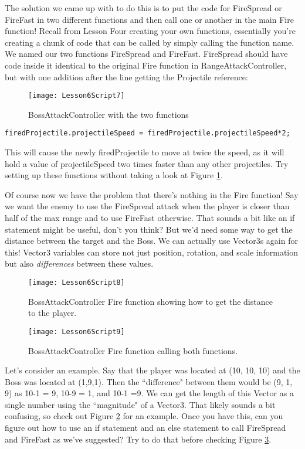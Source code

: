 \documentclass{article}
\begin{document}
The solution we came up with to do this is to put the code for FireSpread or FireFast in two different functions and then call one or another in the main Fire function! Recall from Lesson Four creating your own functions, essentially you're creating a chunk of code that can be called by simply calling the function name. We named our two functions FireSpread and FireFast. FireSpread should have code inside it identical to the original Fire function in RangeAttackController, but with one addition after the line getting the Projectile reference: 

 \begin{figure}
  \texttt{[image: Lesson6Script7]}
  \caption{BossAttackController with the two functions}
  \label{fig:Lesson6Script7}
\end{figure}

\lstset{style=sharpc}
\begin{lstlisting}
firedProjectile.projectileSpeed = firedProjectile.projectileSpeed*2;
\end{lstlisting} 

This will cause the newly firedProjectile to move at twice the speed, as it will hold a value of projectileSpeed two times faster than any other projectiles. Try setting up these functions without taking a look at Figure \ref{fig:Lesson6Script7}.

Of course now we have the problem that there's nothing in the Fire function! Say we want the enemy to use the FireSpread attack when the player is closer than half of the max range and to use FireFast otherwise. That sounds a bit like an if statement might be useful, don't you think? But we'd need some way to get the distance between the target and the Boss. We can actually use Vector3s again for this! Vector3 variables can store not just position, rotation, and scale information but also \textit{differences} between these values. 

 \begin{figure}
  \texttt{[image: Lesson6Script8]}
  \caption{BossAttackController Fire function showing how to get the distance to the player.}
  \label{fig:Lesson6Script8}
\end{figure}
 \begin{figure}
  \texttt{[image: Lesson6Script9]}
  \caption{BossAttackController Fire function calling both functions.}
  \label{fig:Lesson6Script0}
\end{figure}

Let's consider an example. Say that the player was located at (10, 10, 10) and the Boss was located at (1,9,1). Then the ``difference" between them would be (9, 1, 9) as 10-1 = 9, 10-9 = 1, and 10-1 =9. We can get the length of this Vector as a single number using the ``magnitude" of a Vector3. That likely sounds a bit confusing, so check out Figure \ref{fig:Lesson6Script8} for an example. Once you have this, can you figure out how to use an if statement and an else statement to call FireSpread and FireFast as we've suggested? Try to do that before checking Figure \ref{fig:Lesson6Script0}.
\end{document}
